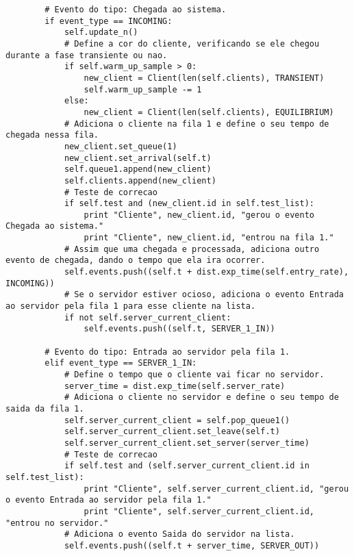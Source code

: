 \begin{lstlisting}
        # Evento do tipo: Chegada ao sistema.
        if event_type == INCOMING:
            self.update_n()
            # Define a cor do cliente, verificando se ele chegou durante a fase transiente ou nao.
            if self.warm_up_sample > 0:
                new_client = Client(len(self.clients), TRANSIENT)
                self.warm_up_sample -= 1
            else:
                new_client = Client(len(self.clients), EQUILIBRIUM)
            # Adiciona o cliente na fila 1 e define o seu tempo de chegada nessa fila.
            new_client.set_queue(1)
            new_client.set_arrival(self.t)
            self.queue1.append(new_client)
            self.clients.append(new_client)
            # Teste de correcao
            if self.test and (new_client.id in self.test_list):
                print "Cliente", new_client.id, "gerou o evento Chegada ao sistema."
                print "Cliente", new_client.id, "entrou na fila 1."
            # Assim que uma chegada e processada, adiciona outro evento de chegada, dando o tempo que ela ira ocorrer.
            self.events.push((self.t + dist.exp_time(self.entry_rate), INCOMING))
            # Se o servidor estiver ocioso, adiciona o evento Entrada ao servidor pela fila 1 para esse cliente na lista.
            if not self.server_current_client:
                self.events.push((self.t, SERVER_1_IN))

        # Evento do tipo: Entrada ao servidor pela fila 1.
        elif event_type == SERVER_1_IN:
            # Define o tempo que o cliente vai ficar no servidor.
            server_time = dist.exp_time(self.server_rate)
            # Adiciona o cliente no servidor e define o seu tempo de saida da fila 1.
            self.server_current_client = self.pop_queue1()
            self.server_current_client.set_leave(self.t)
            self.server_current_client.set_server(server_time)
            # Teste de correcao
            if self.test and (self.server_current_client.id in self.test_list):
                print "Cliente", self.server_current_client.id, "gerou o evento Entrada ao servidor pela fila 1."
                print "Cliente", self.server_current_client.id, "entrou no servidor."
            # Adiciona o evento Saida do servidor na lista.
            self.events.push((self.t + server_time, SERVER_OUT))        


\end{lstlisting}
